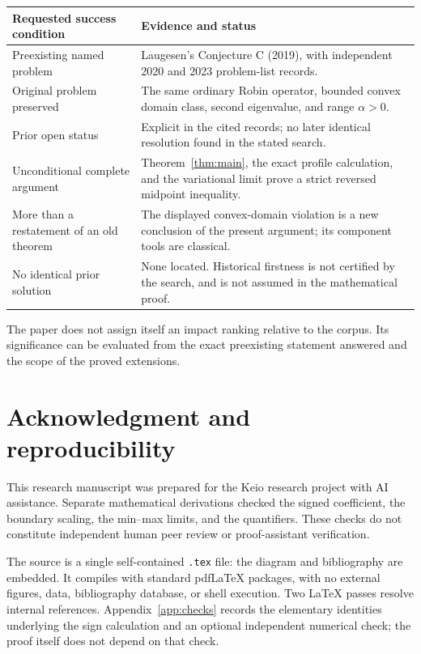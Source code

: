 \documentclass[11pt,a4paper]{article}
\theoremstyle{definition}\newtheorem{definition}[theorem]{Definition}
\theoremstyle{remark}\newtheorem{remark}[theorem]{Remark}
\begin{document}
\begin{center}
\small
\begin{tabular}{@{}p{}p{}@{}}
\toprule
Requested success condition & Evidence and status\\
\midrule
Preexisting named problem &
Laugesen's Conjecture C (2019), with independent 2020 and 2023
problem-list records.\\[4pt]
Original problem preserved &
The same ordinary Robin operator, bounded convex domain class,
second eigenvalue, and range $\alpha>0$.\\[4pt]
Prior open status &
Explicit in the cited records; no later identical resolution
found in the stated search.\\[4pt]
Unconditional complete argument &
Theorem~\ref{thm:main}, the exact profile calculation, and the
variational limit prove a strict reversed midpoint inequality.\\[4pt]
More than a restatement of an old theorem &
The displayed convex-domain violation is a new conclusion of
the present argument; its component tools are classical.\\[4pt]
No identical prior solution &
None located. Historical firstness is not certified by the
search, and is not assumed in the mathematical proof.\\
\bottomrule
\end{tabular}
\end{center}

The paper does not assign itself an impact ranking relative to
the corpus. Its significance can be evaluated from the exact
preexisting statement answered and the scope of the proved
extensions.

\section*{Acknowledgment and reproducibility}
This research manuscript was prepared for the Keio research
project with AI assistance. Separate mathematical derivations
checked the signed coefficient, the boundary scaling, the
min--max limits, and the quantifiers. These checks do not
constitute independent human peer review or proof-assistant
verification.

The source is a single self-contained \texttt{.tex} file:
the diagram and bibliography are embedded. It compiles with
standard pdfLaTeX packages, with no external figures, data,
bibliography database, or shell execution. Two LaTeX passes
resolve internal references. Appendix~\ref{app:checks} records
the elementary identities underlying the sign calculation and
an optional independent numerical check; the proof itself does
not depend on that check.
\appendix
\end{document}
